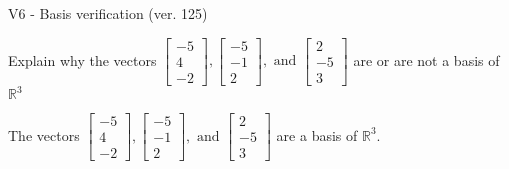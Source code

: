 \begin{exercise}
  \begin{exerciseTitle}V6 - Basis verification (ver. 125)\end{exerciseTitle}
  \begin{exerciseStatement}
    Explain why the vectors \(\left[\begin{array}{r}
-5 \\
4 \\
-2
\end{array}\right] , \left[\begin{array}{r}
-5 \\
-1 \\
2
\end{array}\right] , \text{ and } \left[\begin{array}{r}
2 \\
-5 \\
3
\end{array}\right]\) are or are not a basis of \(\mathbb{R}^3\)	


  \end{exerciseStatement}
  \begin{exerciseAnswer}
   The vectors \(\left[\begin{array}{r}
-5 \\
4 \\
-2
\end{array}\right] , \left[\begin{array}{r}
-5 \\
-1 \\
2
\end{array}\right] , \text{ and } \left[\begin{array}{r}
2 \\
-5 \\
3
\end{array}\right]\) 
  	 are  a basis of \(\mathbb{R}^3\).
  


  \end{exerciseAnswer}
\end{exercise}